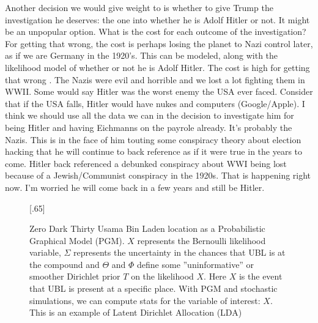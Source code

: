 \documentclass{article}
\begin{document}
\begin{multicols}{2}
Another decision we would give weight to is whether to give Trump the investigation he deserves: the one into whether he is Adolf Hitler or not. It might be an unpopular option. What is the cost for each outcome of the investigation? For getting that wrong, the cost is perhaps losing the planet to Nazi control later, as if we are Germany in the 1920's. This can be modeled, along with the likelihood model of whether or not he is Adolf Hitler. The cost is high for getting that wrong \cite{thinkingintime}. The Nazis were evil and horrible and we lost a lot fighting them in WWII. Some would say Hitler was the worst enemy the USA ever faced. Consider that if the USA falls, Hitler would have nukes and computers (Google/Apple). I think we should use all the data we can in the decision to investigate him for being Hitler and having Eichmanns on the payrole already. It's probably the Nazis. This is in the face of him touting some conspiracy theory about election hacking that he will continue to back reference as if it were true in the years to come. Hitler back referenced a debunked conspiracy about WWI being lost because of a Jewish/Communist conspiracy in the 1920s. That is happening right now. I'm worried he will come back in a few years and still be Hitler.

\closearticle

\end{multicols}

\begin{figure}

  \scalebox{.65}[.65]{}
  
  \caption{Zero Dark Thirty Usama Bin Laden location as a Probabilistic Graphical Model (PGM). $X$ represents the Bernoulli likelihood variable, $\Sigma$ represents the uncertainty in the chances that UBL is at the compound and $\Theta$ and $\Phi$ define some ''uninformative'' or smoother Dirichlet prior $T$ on the likelihood $X$. Here $X$ is the event that UBL is present at a specific place. With PGM and stochastic simulations, we can compute stats for the variable of interest: $X$. This is an example of Latent Dirichlet Allocation (LDA) \cite{lda}}
  
\end{figure}
\end{document}
